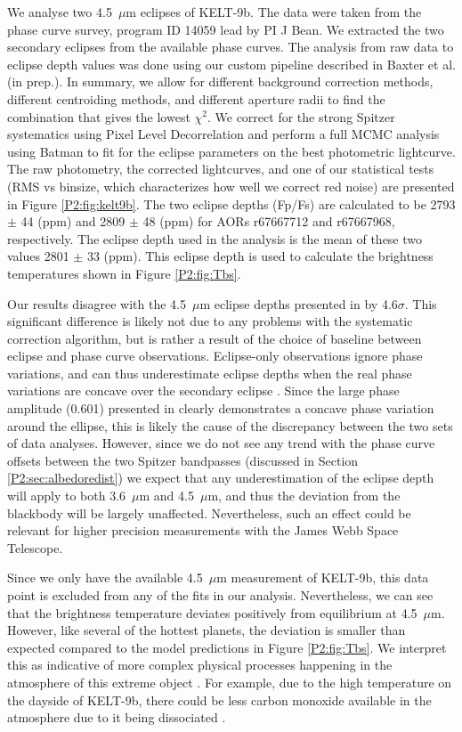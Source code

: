 \begin{subappendices}
We analyse two 4.5~$\mu$m eclipses of KELT-9b. The data were taken from the phase curve survey,   program ID 14059 lead by PI J Bean. We extracted the two secondary eclipses from the available phase curves. The analysis from raw data to eclipse depth values was done using our custom pipeline described in Baxter et al. (in prep.). In summary, we allow for different background correction methods, different centroiding methods, and different aperture radii to find the combination that gives the lowest $\chi^2$. We correct for the strong Spitzer systematics using Pixel Level Decorrelation \citep{Deming2015} and perform a full MCMC analysis using Batman \citep{Kreidberg2015} to fit for the eclipse parameters on the best photometric lightcurve. The raw photometry, the corrected lightcurves, and one of our statistical tests (RMS vs binsize, which characterizes how well we correct red noise) are  presented in Figure \ref{P2:fig:kelt9b}. The two eclipse depths (Fp/Fs) are calculated to be 2793 $\pm$ 44 (ppm) and 2809 $\pm$ 48 (ppm) for AORs r67667712 and r67667968, respectively. The eclipse depth used in the analysis is the mean of these two values 2801 $\pm$ 33 (ppm). This eclipse depth is used to calculate the brightness temperatures shown in Figure \ref{P2:fig:Tbs}.

Our results disagree with the 4.5~$\mu$m eclipse depths presented in \citet{Mansfield2020} by 4.6$\sigma$. This significant difference is likely not due to any problems with the systematic correction algorithm, but is rather a result of the choice of baseline between eclipse and phase curve observations. Eclipse-only observations ignore phase variations, and can thus underestimate eclipse depths when the real phase variations are concave over the secondary eclipse \citep[e.g.,][]{Bell2019}. Since the large phase amplitude (0.601) presented in \citet{Mansfield2020} clearly demonstrates a concave phase variation around the ellipse, this is likely the cause of the discrepancy between the two sets of data analyses. However, since we do not see any trend with the phase curve offsets between the two Spitzer bandpasses (discussed in Section \ref{P2:sec:albedoredist}) we expect that any underestimation of the eclipse depth will apply to both 3.6~$\mu$m and 4.5~$\mu$m, and thus the deviation from the blackbody will be largely unaffected. Nevertheless, such an effect could be relevant for higher precision measurements with the James Webb Space Telescope.

Since we only have the available 4.5~$\mu$m measurement of KELT-9b, this data point is excluded from any of the fits in our analysis. Nevertheless, we can see that the brightness temperature deviates positively from equilibrium at 4.5~$\mu$m. However, like several of the hottest planets, the deviation is smaller than expected compared to the model predictions in Figure \ref{P2:fig:Tbs}. We interpret this as indicative of more complex physical processes happening in the atmosphere of this extreme object \citep{Bell2018, Komacek2018, Lothringer2018, Kitzmann2018, Mansfield2020}. For example, due to the high temperature on the dayside of KELT-9b, there could be less carbon monoxide available in the atmosphere due to it being dissociated \citep{Kitzmann2018}.


\end{subappendices}
